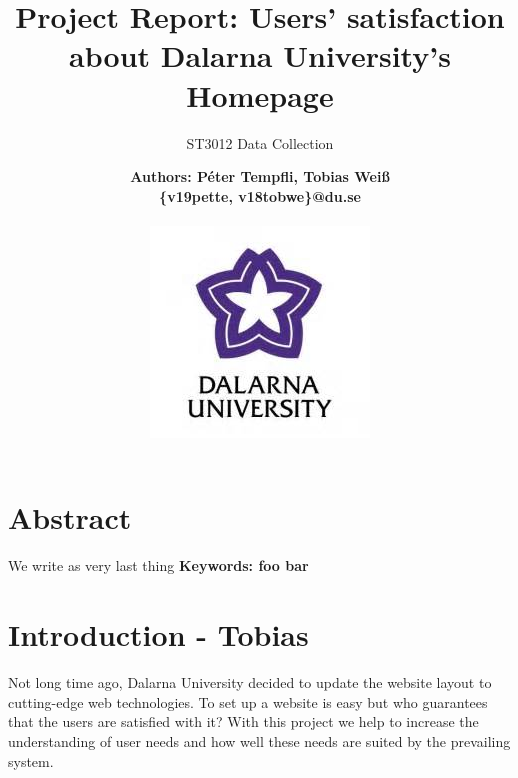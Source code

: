 \documentclass[12pt,a4paper,paper=a4,oneside,titlepage,pdftex]{scrartcl}
\begin{document}
	

\title{Project Report: Users' satisfaction about Dalarna University's Homepage}
\subtitle{ST3012 Data Collection}
\author{
	\bfseries\Large Authors: Péter Tempfli, Tobias Weiß\\
	\{v19pette, v18tobwe\}@du.se
	\\ \\
	\includegraphics[]{figures/du-logo.jpg}\\
}

\maketitle
\tableofcontents
\newpage

\section{Abstract}
We write as very last thing
\vspace{10px}
\textbf{Keywords: foo bar}

\section{Introduction - Tobias}
Not long time ago, Dalarna University decided to update the website layout to cutting-edge web technologies. To set up a website is easy but who guarantees that the users are satisfied with it? With this project we help to increase the understanding of user needs and how well these needs are suited by the prevailing system.
\end{document}
